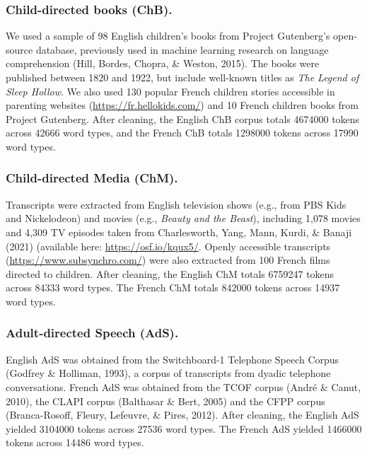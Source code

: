 \documentclass[10pt, letterpaper]{article}
\begin{document}
\hypertarget{child-directed-books-chb.}{%
\subsubsection{Child-directed books
(ChB).}\label{child-directed-books-chb.}}

We used a sample of 98 English children's books from Project Gutenberg's
open-source database, previously used in machine learning research on
language comprehension (Hill, Bordes, Chopra, \& Weston, 2015). The
books were published between 1820 and 1922, but include well-known
titles as \emph{The Legend of Sleep Hollow}. We also used 130 popular
French children stories accessible in parenting websites
(\url{https://fr.hellokids.com/}) and 10 French children books from
Project Gutenberg. After cleaning, the English ChB corpus totals 4674000
tokens across 42666 word types, and the French ChB totals 1298000 tokens
across 17990 word types.

\hypertarget{child-directed-media-chm.}{%
\subsubsection{Child-directed Media
(ChM).}\label{child-directed-media-chm.}}

Transcripts were extracted from English television shows (e.g., from PBS
Kids and Nickelodeon) and movies (e.g., \emph{Beauty and the Beast}),
including 1,078 movies and 4,309 TV episodes taken from Charlesworth,
Yang, Mann, Kurdi, \& Banaji (2021) (available here:
\url{https://osf.io/kqux5/}. Openly accessible transcripts
(\url{https://www.subsynchro.com/}) were also extracted from 100 French
films directed to children. After cleaning, the English ChM totals
6759247 tokens across 84333 word types. The French ChM totals 842000
tokens across 14937 word types.

\hypertarget{adult-directed-speech-ads.}{%
\subsubsection{Adult-directed Speech
(AdS).}\label{adult-directed-speech-ads.}}

English AdS was obtained from the Switchboard-1 Telephone Speech Corpus
(Godfrey \& Holliman, 1993), a corpus of transcripts from dyadic
telephone conversations. French AdS was obtained from the TCOF corpus
(André \& Canut, 2010), the CLAPI corpus (Balthasar \& Bert, 2005) and
the CFPP corpus (Branca-Rosoff, Fleury, Lefeuvre, \& Pires, 2012). After
cleaning, the English AdS yielded 3104000 tokens across 27536 word
types. The French AdS yielded 1466000 tokens across 14486 word types.
\end{document}
